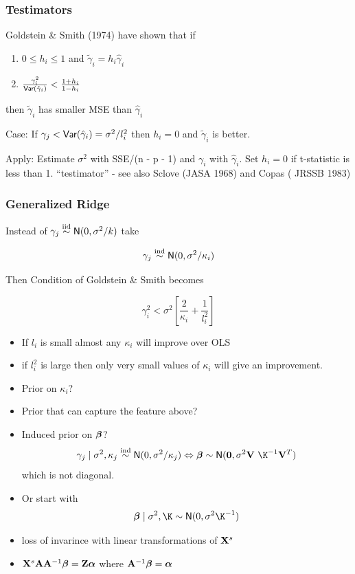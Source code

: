 \documentclass[handout]{beamer}
\begin{document}
\begin{frame} \frametitle{Testimators}

Goldstein \& Smith (1974) have shown that if

\begin{enumerate}
\item
$0 \leq  h_i \leq 1$ and  $\tilde{\gamma}_i = h_i \hat{\gamma}_i$  
\item $\frac{\gamma^2_i}{\textsf{Var}(\hat{\gamma}_i)} < \frac{1 + h_i}{1 - h_i}$
\end{enumerate}
then   $\tilde{\gamma}_i$ has smaller MSE than $\hat{\gamma}_i$

\vspace{14pt}
Case:  If $\gamma_j < \textsf{Var}(\hat{\gamma}_i) = \sigma^2/l_i^2$  then
$h_i = 0$ and $\tilde{\gamma}_i$ is better.

\vspace{11pt}
Apply: Estimate $\sigma^2$ with SSE/(n - p - 1) and $\gamma_i$ with
$\hat{\gamma}_i$.  Set $h_i = 0$ if t-statistic is less than 1.
\vfill 
``testimator'' - see also Sclove (JASA 1968) and Copas ( JRSSB 1983)
\end{frame}
\begin{frame} \frametitle{Generalized Ridge}


Instead of $\gamma_j \mathrel{\mathop{\sim}\limits^{\rm iid}} \textsf{N}(0, \sigma^2/k)$ take 

$$\gamma_j \mathrel{\mathop{\sim}\limits^{\rm ind}} \textsf{N}(0, \sigma^2/\kappa_i)$$  \pause

Then Condition of Goldstein \& Smith becomes

$$
\gamma_i^2 < \sigma^2\left[ \frac{2}{\kappa_i} + \frac{1}{l_i^2}  \right]
$$ \pause
\begin{itemize}
\item 
If $l_i$ is small almost any $\kappa_i$ will improve over OLS \pause
\item 
if $l_i^2$ is large then only very small values of $\kappa_i$ will give an
improvement. \pause
\item Prior on $\kappa_i$?   \pause
\item Prior that can capture the feature above?

\end{itemize}

\end{frame}
\begin{frame}
  \begin{itemize}
\item Induced prior on $\boldsymbol{\beta}$?  
$$\gamma_j \mid \sigma^2, \kappa_j  \ind \N(0, \sigma^2/\kappa_j) \Leftrightarrow 
\b \sim \N(\zero, \sigma^2 \V\ \K^{-1} \V^T)$$
which is not diagonal.   
  \item  Or start with $$\b  \mid \sigma^2, \K \sim \N(0, \sigma^2 \K^{-1})$$
 \item loss of invarince with linear transformations of $\mathbf{X}^s$
\item $\mathbf{X}^s \mathbf{A} \mathbf{A}^{-1} \boldsymbol{\beta} = \mathbf{Z} \boldsymbol{\alpha}$ where $\mathbf{A}^{-1} \boldsymbol{\beta} = \boldsymbol{\alpha}$
  \end{itemize}
\end{frame}
\end{document}
